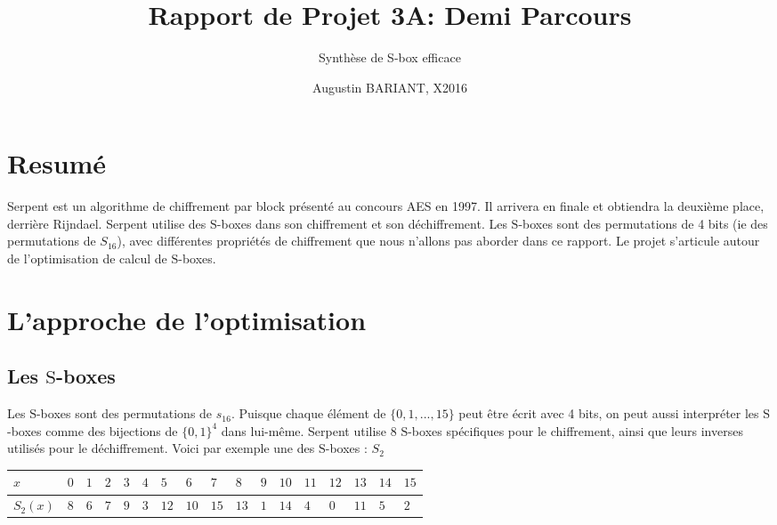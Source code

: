 \documentclass{article}
\title{Rapport de Projet 3A: Demi Parcours}
\subtitle{Synthèse de S-box efficace}
\author{Augustin BARIANT, X2016}
\begin{document}
\maketitle
\tableofcontents
\section{Resumé}



\bigbreak

Serpent est un algorithme de chiffrement par block présenté au concours AES en 1997. Il arrivera en finale et obtiendra la deuxième place, derrière Rijndael. Serpent utilise des $\mathrm{S}$-boxes dans son chiffrement et son déchiffrement. Les $\mathrm{S}$-boxes sont des permutations de 4 bits (ie des permutations de $S_{16}$), avec différentes propriétés de chiffrement que nous n'allons pas aborder dans ce rapport. Le projet s'articule autour de l'optimisation de calcul de $\mathrm{S}$-boxes. 


\section{L'approche de l'optimisation}

\subsection{Les $\mathrm{S}$-boxes}

Les $\mathrm{S}$-boxes sont des permutations de $s_{16}$. Puisque chaque élément de $\{0,1,...,15\}$ peut être écrit avec 4 bits, on peut aussi interpréter les $\mathrm{S}$-boxes comme des bijections de $\{0,1\}^{4}$ dans lui-même. Serpent utilise 8 $\mathrm{S}$-boxes spécifiques pour le chiffrement, ainsi que leurs inverses utilisés pour le déchiffrement. Voici par exemple une des $\mathrm{S}$-boxes : $S_{2}$
\medbreak
\begin{center}
\begin{tabular}{|l|l|l|l|l|l|l|l|l|l|l|l|l|l|l|l|l|}
\hline
\multicolumn{1}{|l|}{$x$}&	\multicolumn{1}{|l|}{ $0$}&	\multicolumn{1}{|l|}{ $1$}&	\multicolumn{1}{|l|}{ $2$}&	\multicolumn{1}{|l|}{ $3$}&	\multicolumn{1}{|l|}{ $4$}&	\multicolumn{1}{|l|}{ $5$}&	\multicolumn{1}{|l|}{ $6$}&	\multicolumn{1}{|l|}{ $7$}&	\multicolumn{1}{|l|}{ $8$}&	\multicolumn{1}{|l|}{ $9$}&	\multicolumn{1}{|l|}{ $10$}&	\multicolumn{1}{|l|}{ $11$}&	\multicolumn{1}{|l|}{ $12$}&	\multicolumn{1}{|l|}{ $13$}&	\multicolumn{1}{|l|}{ $14$}&	\multicolumn{1}{|l|}{ $15$}	\\
\hline
\multicolumn{1}{|l|}{ $S_{2}(x)$}&	\multicolumn{1}{|l|}{ $8$}&	\multicolumn{1}{|l|}{ $6$}&	\multicolumn{1}{|l|}{ $7$}&	\multicolumn{1}{|l|}{ $9$}&	\multicolumn{1}{|l|}{ $3$}&	\multicolumn{1}{|l|}{ $12$}&	\multicolumn{1}{|l|}{ $10$}&	\multicolumn{1}{|l|}{ $15$}&	\multicolumn{1}{|l|}{ $13$}&	\multicolumn{1}{|l|}{ $1$}&	\multicolumn{1}{|l|}{ $14$}&	\multicolumn{1}{|l|}{ $4$}&	\multicolumn{1}{|l|}{ $0$}&	\multicolumn{1}{|l|}{ $11$}&	\multicolumn{1}{|l|}{ $5$}&	\multicolumn{1}{|l|}{ $2$}	\\
\hline

\end{tabular}
\end{center}
\medbreak
\end{document}

